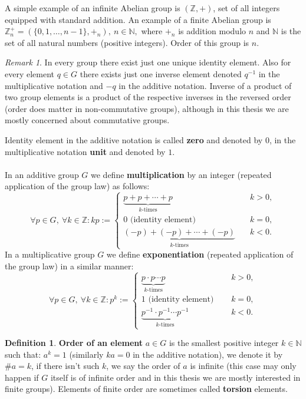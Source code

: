 \documentclass[thesis=M,english]{FITthesis}[2012/10/20]
\theoremstyle{remark}
\newtheorem*{RM}{Remark}
\theoremstyle{definition}
\newtheorem{DF}{Definition}[section]
\begin{document}
\noindent A simple example of an infinite Abelian group is $(\mathbb{Z}, +)$, set of all integers equipped with standard addition. An example of a finite Abelian group is $\mathbb{Z}_n^+ = (\{0, 1, \ldots, n-1\}, +_{n}),\ n \in \mathbb{N},$ where $+_n$ is addition modulo $n$ and $\mathbb{N}$ is the set of all natural numbers (positive integers). Order of this group is $n$.
\begin{RM}
In every group there exist just one unique identity element. Also for every element $q \in G$ there exists just one inverse element denoted $q^{-1}$ in the multiplicative notation and $-q$ in the additive notation. Inverse of a product of two group elements is a product of the respective inverses in the reversed order (order does matter in non-commutative groups), although in this thesis we are mostly concerned about commutative groups.
\end{RM}
\noindent Identity element in the additive notation is called \textbf{zero} and denoted by $0$, in the multiplicative notation \textbf{unit} and denoted by $1$. \\ \\
In an additive group $G$ we define \textbf{multiplication} by an integer (repeated application of the group law) as follows:
$$
\forall p \in G,\ \forall k \in \mathbb{Z}: kp := \begin{cases} \underbrace{p + p + \cdots + p}_{\text{$k$-times}} &\quad k > 0, \\
0 \text{ (identity element) } &\quad k = 0, \\
\underbrace{(-p) + (-p) + \cdots + (-p)}_{\text{$k$-times}} &\quad k < 0.
\end{cases}
$$
In a multiplicative group $G$ we define \textbf{exponentiation} (repeated application of the group law) in a similar manner:
$$
\forall p \in G,\ \forall k \in \mathbb{Z}: p^k := \begin{cases} \underbrace{p \cdot p \cdots  p}_{\text{$k$-times}} &\quad k > 0, \\
1 \text{ (identity element) } &\quad k = 0, \\
\underbrace{p^{-1} \cdot p^{-1} \cdots  p^{-1}}_{\text{$k$-times}} &\quad k < 0.
\end{cases}
$$
\begin{DF}
\textbf{Order of an element} $a \in G$ is the smallest positive integer $k \in \mathbb{N}$ such that: $a^k = 1$ (similarly $ka = 0$ in the additive notation), we denote it by $\#a= k$, if there isn't such $k$, we say the order of $a$ is infinite (this case may only happen if $G$ itself is of infinite order and in this thesis we are mostly interested in finite groups). Elements of finite order are sometimes called \textbf{torsion} elements.
\end{DF}
\end{document}
